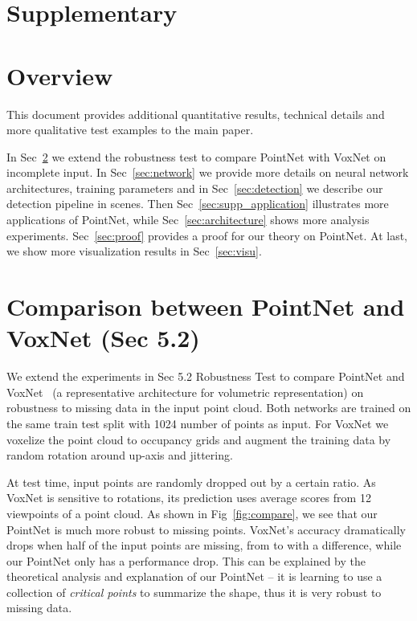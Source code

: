 \documentclass[10pt,twocolumn,letterpaper]{article}
\begin{document}
\newpage
\appendix
\section*{Supplementary}

\section{Overview}
This document provides additional quantitative results, technical details and more qualitative test examples to the main paper.

In Sec~\ref{sec:cla_robust} we extend the robustness test to compare PointNet with VoxNet on incomplete input. In Sec~\ref{sec:network} we provide more details on neural network architectures, training parameters and in Sec~\ref{sec:detection} we describe our detection pipeline in scenes. Then Sec~\ref{sec:supp_application} illustrates more applications of PointNet, while Sec~\ref{sec:architecture} shows more analysis experiments. Sec~\ref{sec:proof} provides a proof for our theory on PointNet. At last, we show more visualization results in Sec~\ref{sec:visu}.


\section{Comparison between PointNet and VoxNet (Sec 5.2)}
\label{sec:cla_robust}
We extend the experiments in Sec 5.2 Robustness Test to compare PointNet and VoxNet~\cite{maturana2015voxnet} (a representative architecture for volumetric representation) on robustness to missing data in the input point cloud. Both networks are trained on the same train test split with 1024 number of points as input. For VoxNet we voxelize the point cloud to  occupancy grids and augment the training data by random rotation around up-axis and jittering.

At test time, input points are randomly dropped out by a certain ratio. As VoxNet is sensitive to rotations, its prediction uses average scores from 12 viewpoints of a point cloud. As shown in Fig~\ref{fig:compare}, we see that our PointNet is much more robust to missing points. VoxNet's accuracy dramatically drops when half of the input points are missing, from  to  with a  difference, while our PointNet only has a  performance drop. This can be explained by the theoretical analysis and explanation of our PointNet -- it is learning to use a collection of \textit{critical points} to summarize the shape, thus it is very robust to missing data.
\end{document}
